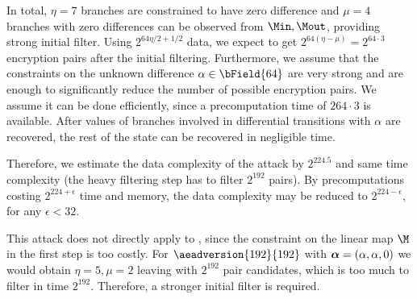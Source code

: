 In total, $\eta=7$ branches are constrained to have zero difference and $\mu=4$ branches with zero differences can be observed from $\Min,\Mout$, providing strong initial filter. Using $2^{64\eta/2+1/2}$ data, we expect to get  $2^{64(\eta-\mu)}=2^{64\cdot 3}$ encryption pairs after the initial filtering. Furthermore, we assume that the constraints on the unknown difference $\alpha \in \bField{64}$ are very strong and are enough to significantly reduce the number of possible encryption pairs. We assume it can be done efficiently, since a precomputation time of $2{64\cdot3}$ is available.
After values of branches involved in differential transitions with $\alpha$ are recovered, the rest of the state can be recovered in negligible time.

Therefore, we estimate the data complexity of the attack by $2^{224.5}$ and same time complexity (the heavy filtering step has to filter $2^{192}$ pairs). By precomputations costing $2^{224+\epsilon}$ time and memory, the data complexity may be reduced to $2^{224-\epsilon}$, for any $\epsilon < 32$.

This attack does not directly apply to ,  since the constraint on the linear map $\M$ in the first step is too costly. For $\aeadversion{192}{192}$ with $\boldsymbol{\alpha} = (\alpha,\alpha,0)$ we would obtain $\eta=5,\mu=2$ leaving with $2^{192}$ pair candidates, which is too much to filter in time $2^{192}$. Therefore, a stronger initial filter is required.
